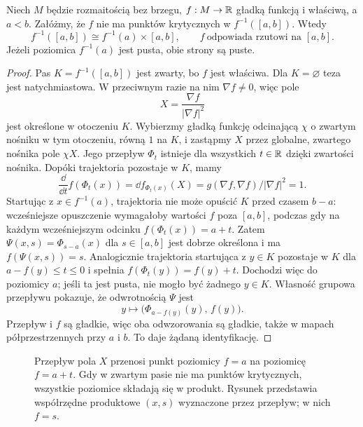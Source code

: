 \begin{twierdzenie}
\label{thm:pas-bez-krytycznych-15}
Niech $M$ będzie rozmaitością bez brzegu,
$f:M\to\mathbb{R}$ gładką funkcją
i właściwą, a $a<b$. Załóżmy,
że $f$ nie ma punktów krytycznych
w $f^{-1}([a,b])$. Wtedy
\[
 f^{-1}([a,b])\cong f^{-1}(a)\times[a,b],
 \qquad f\ \text{odpowiada rzutowi na }[a,b].
\]
Jeżeli poziomica $f^{-1}(a)$ jest pusta,
obie strony są puste.
\end{twierdzenie}
\begin{proof}
Pas $K=f^{-1}([a,b])$ jest zwarty,
bo $f$ jest właściwa. Dla $K=\varnothing$ teza
jest natychmiastowa. W przeciwnym razie na nim
$\nabla f\ne0$, więc pole
\[
 X=\frac{\nabla f}{|\nabla f|^2}
\]
jest określone w otoczeniu $K$.
Wybierzmy gładką funkcję
odcinającą $\chi$ o zwartym
nośniku w tym otoczeniu,
równą $1$ na $K$, i zastąpmy
$X$ przez globalne, zwartego
nośnika pole $\chi X$.
Jego przepływ $\Phi_t$
istnieje dla wszystkich
$t\in\mathbb{R}$ dzięki zwartości
nośnika. Dopóki trajektoria
pozostaje w $K$, mamy
\[
 \frac{\dd}{\dd t}f(\Phi_t(x))
 =\dd f_{\Phi_t(x)}(X)
 =g(\nabla f,\nabla f)/|\nabla f|^2=1.
\]
Startując z $x\in f^{-1}(a)$,
trajektoria nie może opuścić
$K$ przed czasem $b-a$:
wcześniejsze opuszczenie
wymagałoby wartości $f$
poza $[a,b]$, podczas gdy
na każdym wcześniejszym
odcinku $f(\Phi_t(x))=a+t$.
Zatem
$\Psi(x,s)=\Phi_{s-a}(x)$
dla $s\in[a,b]$ jest
dobrze określona i ma
$f(\Psi(x,s))=s$.
Analogicznie trajektoria startująca z $y\in K$
pozostaje w $K$ dla $a-f(y)\leq t\leq0$ i spełnia
$f(\Phi_t(y))=f(y)+t$. Dochodzi więc do poziomicy $a$;
jeśli ta jest pusta, nie mogło być żadnego $y\in K$.
Własność grupowa przepływu pokazuje, że odwrotnością
$\Psi$ jest
\[
 y\longmapsto
       \bigl(\Phi_{a-f(y)}(y),\,f(y)\bigr).
\]
Przepływ i $f$ są gładkie,
więc oba odwzorowania są gładkie,
także w mapach półprzestrzennych
przy $a$ i $b$. To daje
żądaną identyfikację.
\end{proof}

\begin{figure}[H]
\centering
{}
\caption{Przepływ pola $X$ przenosi punkt poziomicy
$f=a$ na poziomicę $f=a+t$. Gdy w zwartym pasie
nie ma punktów krytycznych, wszystkie poziomice
składają się w produkt. Rysunek przedstawia współrzędne
produktowe $(x,s)$ wyznaczone przez przepływ; w nich $f=s$.}
\label{fig:pas-bez-krytycznych-15}
\end{figure}


